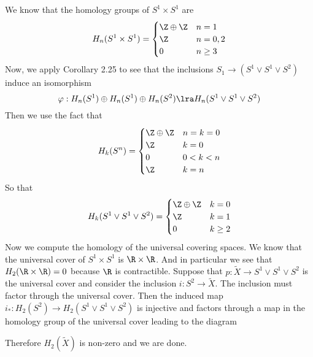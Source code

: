 \documentclass{article}
\begin{document}
\begin{solution}{\parindent}
  We know that the homology groups of $S^1 \times S^1$ are
  \[
  H_n(S^1 \times S^1) =
  \begin{cases}
    \Z \oplus \Z & n = 1 \\
    \Z & n = 0,2 \\
    0 & n \geq 3
  \end{cases}
  \]
  Now, we apply Corollary 2.25 to see that the inclusions $S_1 \to
  (S^1\vee S^1\vee S^2)$ induce an isomorphism
  \[
  \varphi: H_n(S^1) \oplus H_n(S^1) \oplus H_n(S^2) \lra H_n(S^1\vee
  S^1\vee S^2)
  \]
  Then we use the fact that
  \[
  H_k(S^n) =
  \begin{cases}
    \Z \oplus \Z & n=k=0 \\
    \Z & k = 0 \\
    0 & 0 < k < n \\
    \Z & k = n
  \end{cases}
  \]
  So that
  \[
  H_k(S^1\vee S^1\vee S^2) =
  \begin{cases}
    \Z \oplus \Z & k = 0\\
    \Z & k = 1 \\
    0 & k \geq 2
  \end{cases}
  \]
  Now we compute the homology of the universal covering spaces. We
  know that the universal cover of $S^1 \times S^1$ is $\R \times
  \R$. And in particular we see that $H_2(\R \times \R) = 0$ because
  $\R$ is contractible. Suppose that $p:\tilde{X} \to S^1\vee S^1\vee
  S^2$ is the universal cover and consider the inclusion $i: S^2 \to
  \tilde{X}$. The inclusion must factor through the universal
  cover. Then the induced map $i_\ast: H_2(S^2) \to H_2(S^1\vee
  S^1\vee S^2)$ is injective and factors through a map in the homology
  group of the universal cover leading to the diagram
  \begin{center}
  \end{center}
  Therefore $H_2(\tilde{X})$ is non-zero and we are done.
\end{solution}
\end{document}
